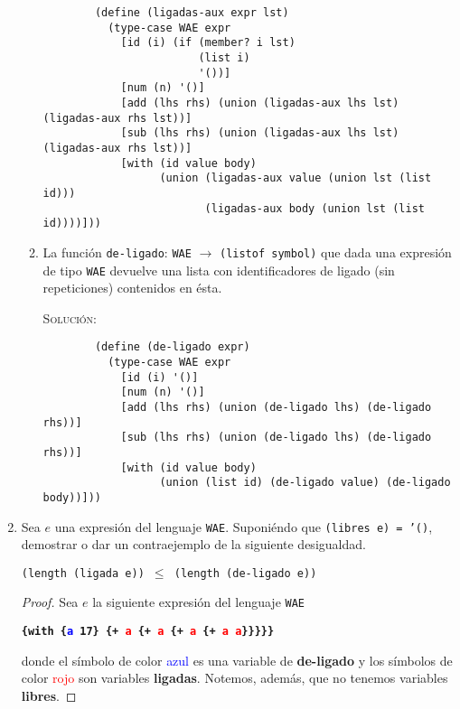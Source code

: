 \documentclass[letterpaper,11pt]{article}
\begin{document}
\begin{enumerate}
\begin{enumerate}
\begin{verbatim}
        (define (ligadas-aux expr lst)
          (type-case WAE expr
            [id (i) (if (member? i lst)
                        (list i)
                        '())]
            [num (n) '()]
            [add (lhs rhs) (union (ligadas-aux lhs lst) (ligadas-aux rhs lst))]
            [sub (lhs rhs) (union (ligadas-aux lhs lst) (ligadas-aux rhs lst))]
            [with (id value body)
                  (union (ligadas-aux value (union lst (list id))) 
                         (ligadas-aux body (union lst (list id))))]))
        \end{verbatim}

        \item La función \texttt{de-ligado}: \texttt{WAE} $\rightarrow$ 
        \texttt{(listof symbol)} que dada una expresión de tipo \texttt{WAE} 
        devuelve una lista con identificadores de ligado (sin repeticiones) 
        contenidos en ésta.

        \textsc{Solución:}
        \begin{verbatim}
        (define (de-ligado expr) 
          (type-case WAE expr
            [id (i) '()]
            [num (n) '()]
            [add (lhs rhs) (union (de-ligado lhs) (de-ligado rhs))]
            [sub (lhs rhs) (union (de-ligado lhs) (de-ligado rhs))]
            [with (id value body)
                  (union (list id) (de-ligado value) (de-ligado body))]))
        \end{verbatim}
    \end{enumerate} 

    \item Sea $e$ una expresión del lenguaje \texttt{WAE}. Suponiéndo que 
    \texttt{(libres e) = '()}, demostrar o dar un contraejemplo de la siguiente 
    desigualdad.
    \begin{center}
        \texttt{(length (ligada e)) $\leq$ (length (de-ligado e))}
    \end{center}

    \begin{proof}
        Sea $e$ la siguiente expresión del lenguaje \texttt{WAE}
        \begin{center}
            \texttt{\textbf{\{with \{\textcolor{blue}{a} 17\} 
            \{+ \textcolor{red}{a} \{+ \textcolor{red}{a} \{+ \textcolor{red}{a} 
            \{+ \textcolor{red}{a} \textcolor{red}{a}\}\}\}\}\}}}
        \end{center}

        donde el símbolo de color \textcolor{blue}{azul} es una variable de 
        \textbf{de-ligado} y los símbolos de color \textcolor{red}{rojo} son 
        variables \textbf{ligadas}. Notemos, además, que no tenemos variables 
        \textbf{libres}. 


\end{proof}
\end{enumerate}
\end{document}
